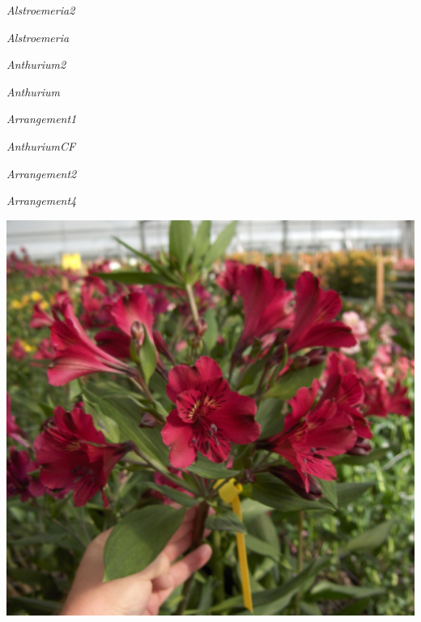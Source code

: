 \documentclass{article}
\begin{document}
\noindent
\vfill
\centerline{{\Large\emph{Alstroemeria2}}}
\vfill
\newpage

\noindent
\vfill
\centerline{{\Large\emph{Alstroemeria}}}
\vfill
\newpage

\noindent
\vfill
\centerline{{\Large\emph{Anthurium2}}}
\vfill
\newpage

\noindent
\vfill
\centerline{{\Large\emph{Anthurium}}}
\vfill
\newpage

\noindent
\vfill
\centerline{{\Large\emph{Arrangement1}}}
\vfill
\newpage

\noindent
\vfill
\centerline{{\Large\emph{AnthuriumCF}}}
\vfill
\newpage

\noindent
\vfill
\centerline{{\Large\emph{Arrangement2}}}
\vfill
\newpage

\noindent
\vfill
\centerline{{\Large\emph{Arrangement4}}}
\vfill
\newpage


\begin{center}
\includegraphics[height=0.925\paperheight]{../Alstroemeria.jpg}
\end{center}
\newpage
\end{document}
